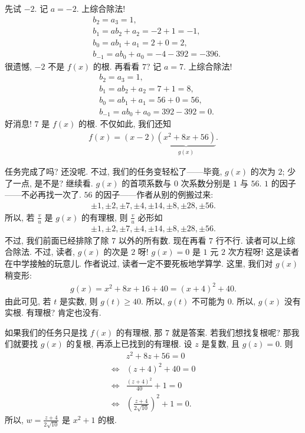 \begin{example}
    先试 $-2$. 记 $a = -2$. 上综合除法!
    \begin{align*}
         & b_2 = a_3 = 1,                          \\
         & b_1 = a b_2 + a_2 = -2 + 1 = -1,        \\
         & b_0 = a b_1 + a_1 = 2 + 0 = 2,          \\
         & b_{-1} = a b_0 + a_0 = -4 - 392 = -396.
    \end{align*}
    很遗憾, $-2$ 不是 $f(x)$ 的根. 再看看 $7$? 记 $a = 7$. 上综合除法!
    \begin{align*}
         & b_2 = a_3 = 1,                        \\
         & b_1 = a b_2 + a_2 = 7 + 1 = 8,        \\
         & b_0 = a b_1 + a_1 = 56 + 0 = 56,      \\
         & b_{-1} = a b_0 + a_0 = 392 - 392 = 0.
    \end{align*}
    好消息! $7$ 是 $f(x)$ 的根. 不仅如此, 我们还知
    \begin{align*}
        f(x) = (x - 2)\underbrace{(x^2 + 8x + 56)}_{g(x)}.
    \end{align*}

    任务完成了吗? 还没呢. 不过, 我们的任务变轻松了——毕竟, $g(x)$ 的次为 $2$; 少了一点, 是不是? 继续看. $g(x)$ 的首项系数与 $0$ 次系数分别是 $1$ 与 $56$. $1$ 的因子——不必再找一次了. $56$ 的因子——作者从别的例搬过来:
    \begin{align*}
        \pm 1, \pm 2, \pm 7, \pm 4, \pm 14, \pm 8, \pm 28, \pm 56.
    \end{align*}
    所以, 若 $\frac{v}{u}$ 是 $g(x)$ 的有理根, 则 $\frac{v}{u}$ 必形如
    \begin{align*}
        \pm 1, \pm 2, \pm 7, \pm 4, \pm 14, \pm 8, \pm 28, \pm 56.
    \end{align*}
    不过, 我们前面已经排除了除 $7$ 以外的所有数. 现在再看 $7$ 行不行. 读者可以上综合除法. 不过, 读者, $g(x)$ 的次是 $2$ 呀! $g(x) = 0$ 是 $1$ 元 $2$ 次方程呀! 这是读者在中学接触的玩意{\scriptsize 儿}. 作者说过, 读者一定不要死板地学算学. 这里, 我们对 $g(x)$ 稍变形:
    \begin{align*}
        g(x) = x^2 + 8x + 16 + 40 = (x + 4)^2 + 40.
    \end{align*}
    由此可见, 若 $t$ 是实数, 则 $g(t) \geq 40$. 所以, $g(t)$ 不可能为 $0$. 所以, $g(x)$ 没有实根. 有理根? 肯定也没有.

    如果我们的任务只是找 $f(x)$ 的有理根, 那 $7$ 就是答案. 若我们想找复根呢? 那我们就要找 $g(x)$ 的复根, 再添上已找到的有理根. 设 $z$ 是复数, 且 $g(z) = 0$. 则
    \begin{align*}
                & z^2 + 8z + 56 = 0                                  \\
        \iff {} & (z + 4)^2 + 40 = 0                                 \\
        \iff {} & \frac{(z + 4)^2}{40} + 1 = 0                       \\
        \iff {} & \left( \frac{z + 4}{2\sqrt{10}} \right)^2 + 1 = 0.
    \end{align*}
    所以, $w = \frac{z + 4}{2\sqrt{10}}$ 是 $x^2 + 1$ 的根.


\end{example}
